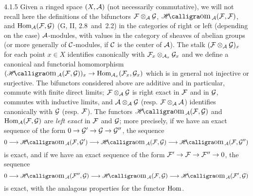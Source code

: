 \begin{env}{4.1.5}
\label{env-0.4.1.5}
Given a ringed space $(X,\mathcal{A})$ (not necessarily commutative), we will not recall here the definitions of the
bifunctors $\mathcal{F}\otimes_{\mathcal{A}}\mathcal{G}$, $\sheafHom_{\sheaf{A}}(\sheaf{F},\sheaf{F})$, and
$\operatorname{Hom}_{\mathcal{A}}(\mathcal{F},\mathcal{G})$ (G, II, 2.8~and~2.2) in the categories of right or left (depending on
the case) $\mathcal{A}$-modules, with values in the category of sheaves of abelian groups (or more generally
of $\mathcal{C}$-modules, if $\mathcal{C}$ is the center of $\mathcal{A}$). The stalk $(\mathcal{F}\otimes_{\mathcal{A}}\mathcal{G})_x$
for each point $x\in X$ identifies canonically with $\mathcal{F}_x\otimes_{\mathcal{A}_x}\mathcal{G}_x$ and we define a
canonical and functorial homomorphism $(\sheafHom_{\sheaf{A}}(\sheaf{F},\sheaf{G}))_x\to\Hom_{\sheaf{A}_x}(\sheaf{F}_x,\sheaf{G}_x)$
which is in general not injective or surjective. The bifunctors considered above are additive and in particular,
commute with finite direct limits; $\mathcal{F}\otimes_{\mathcal{A}}\mathcal{G}$ is right exact in $\mathcal{F}$ and in $\mathcal{G}$,
commutes with inductive limits, and $\mathcal{A}\otimes_{\mathcal{A}}\mathcal{G}$ (resp. $\mathcal{F}\otimes_{\mathcal{A}}\mathcal{A}$)
identifies canonically with $\mathcal{G}$ (resp. $\mathcal{F}$). The functors $\sheafHom_{\sheaf{A}}(\sheaf{F},\sheaf{G})$ and
$\operatorname{Hom}_{\mathcal{A}}(\mathcal{F},\mathcal{G})$ are \emph{left exact} in $\mathcal{F}$ and $\mathcal{G}$; more precisely,
if we have an exact sequence of the form $0\to\mathcal{G}'\to\mathcal{G}\to\mathcal{G}''$, the sequence
\[
  0\longrightarrow\sheafHom_{\sheaf{A}}(\sheaf{F},\sheaf{G}')\longrightarrow
  \sheafHom_{\sheaf{A}}(\sheaf{F},\sheaf{G})\longrightarrow\sheafHom_{\sheaf{A}}(\sheaf{F},\sheaf{G}'')
\]
is exact, and if we have an exact sequence of the form $\mathcal{F}'\to\mathcal{F}\to\mathcal{F}''\to 0$, the sequence
\[
  0\longrightarrow\sheafHom_{\sheaf{A}}(\sheaf{F}'',\sheaf{G})\longrightarrow
  \sheafHom_{\sheaf{A}}(\sheaf{F},\sheaf{G})\longrightarrow\sheafHom_{\sheaf{A}}(\sheaf{F}',\sheaf{G})
\]
is exact, with the analagous properties for the functor $\operatorname{Hom}$.
\end{env}


